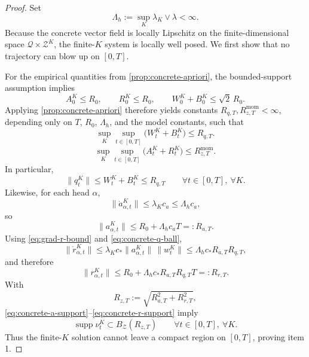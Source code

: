 \documentclass{article}
\theoremstyle{definition}
\begin{document}
\begin{proof}
Set
\[
  \Lambda_h:=\sup_K\lambda_K\vee\lambda<\infty.
\]
Because the concrete vector field is locally Lipschitz on the finite-dimensional space $\mathcal Q\times\mathcal Z^K$, the finite-$K$ system is locally well posed. We first show that no trajectory can blow up on $[0,T]$.

For the empirical quantities from \cref{prop:concrete-apriori}, the bounded-support assumption implies
\[
  A_0^K\le R_0,
  \qquad
  R_0^K\le R_0,
  \qquad
  W_0^K+B_0^K\le \sqrt2\,R_0.
\]
Applying \cref{prop:concrete-apriori} therefore yields constants $R_{q,T},R_{z,T}^{\mathrm{mom}}<\infty$, depending only on $T$, $R_0$, $\Lambda_h$, and the model constants, such that
\begin{equation}
  \sup_K\sup_{t\in[0,T]}
  \bigl(
    W_t^K+B_t^K
  \bigr)
  \le
  R_{q,T}.
  \label{eq:concrete-q-ball}
\end{equation}
\begin{equation}
  \sup_K\sup_{t\in[0,T]}
  \bigl(
    A_t^K+R_t^K
  \bigr)
  \le
  R_{z,T}^{\mathrm{mom}}.
  \label{eq:concrete-z-moment-ball}
\end{equation}
In particular,
\[
  \|q_t^K\|
  \le
  W_t^K+B_t^K
  \le
  R_{q,T}
  \qquad
  \forall t\in[0,T],\ \forall K.
\]
Likewise, for each head $\alpha$,
\[
  \|\dot a_{\alpha,t}^K\|
  \le
  \lambda_K c_a
  \le
  \Lambda_h c_a,
\]
so
\begin{equation}
  \|a_{\alpha,t}^K\|
  \le
  R_0+\Lambda_h c_a T
  =:
  R_{a,T}.
  \label{eq:concrete-a-support}
\end{equation}
Using \eqref{eq:grad-r-bound} and \eqref{eq:concrete-q-ball},
\[
  \|\dot r_{\alpha,t}^K\|
  \le
  \lambda_K c_\ast \|a_{\alpha,t}^K\|\,\|w_t^K\|
  \le
  \Lambda_h c_\ast R_{a,T} R_{q,T},
\]
and therefore
\begin{equation}
  \|r_{\alpha,t}^K\|
  \le
  R_0+\Lambda_h c_\ast R_{a,T}R_{q,T}T
  =:
  R_{r,T}.
  \label{eq:concrete-r-support}
\end{equation}
With
\[
  R_{z,T}:=\sqrt{R_{a,T}^2+R_{r,T}^2},
\]
\eqref{eq:concrete-a-support}--\eqref{eq:concrete-r-support} imply
\begin{equation}
  \operatorname{supp}\nu_t^K\subset B_{\mathcal Z}(R_{z,T})
  \qquad
  \forall t\in[0,T],\ \forall K.
  \label{eq:concrete-z-ball}
\end{equation}
Thus the finite-$K$ solution cannot leave a compact region on $[0,T]$, proving item 1.


\end{proof}
\end{document}
